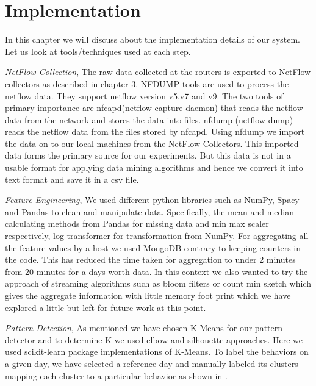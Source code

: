 
\chapter{Implementation}

In this chapter we will discuss about the implementation details of our system. Let us look at tools/techniques used at each step.  

\textit{NetFlow Collection},  The raw data collected at the routers is exported to NetFlow collectors as described in chapter 3. NFDUMP \cite{} tools are used to process the netflow data. They support netflow version v5,v7 and v9. The two tools of primary importance are nfcapd(netflow capture daemon) that reads the netflow data from the network and stores the data into files. nfdump (netflow dump) reads the netflow data from the files stored by nfcapd. Using nfdump we import the data on to our local machines
from the NetFlow Collectors. This imported data forms the
primary source for our experiments. But this data is not in a usable format for applying data mining algorithms and hence we convert it into text format and save it in a csv file.

\textit{Feature Engineering}, We used different python libraries such as NumPy, Spacy and Pandas to clean and manipulate data. Specifically, the mean and median calculating methods from Pandas for missing data and min max scaler respectively, log transformer for transformation from NumPy. For aggregating all the feature values by a host we used MongoDB contrary to keeping counters in the code. This has reduced the time taken  for aggregation to under 2 minutes from 20 minutes for a days worth data. In this context we also wanted to try the approach of streaming algorithms such as bloom filters or count min sketch which gives the aggregate information with little memory foot print which we have explored a little but left for future work at this point.

\textit{Pattern Detection}, As mentioned we have chosen K-Means for our pattern detector and to determine K we used elbow and silhouette approaches. Here we used scikit-learn package implementations of K-Means. To label the behaviors on a given day, we have selected a reference day and manually labeled its clusters mapping each cluster to a particular behavior as shown in .

